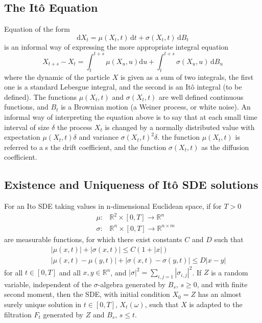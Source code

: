 \documentclass[12pt]{paper}
\begin{document}
\subsection{The It\^{o} Equation}
Equation of the form 
\begin{equation*}
 \mathrm{d} X_t = \mu(X_t,t)\, \mathrm{d} t +  \sigma(X_t,t)\, \mathrm{d} B_t
\end{equation*}
is an informal way of expressing the more appropriate integral equation 
\begin{equation*}
X_{t+s} - X_{t} = \int_t^{t+s} \mu(X_u,u) \mathrm{d} u + \int_t^{t+s} \sigma(X_u,u)\, \mathrm{d} B_u
\end{equation*}
where the dynamic of the particle $X$ is given as a sum of two integrals, the first one is a standard Lebesgue integral, and the second is an It\^{o} integral (to be defined).  
The functions $\mu(X_t,t)$ and $\sigma(X_t,t)$ are well defined continuous functions, and $B_t$ is a Brownian motion (a Weiner process, or white noise). An informal way of interpreting the equation above is to say that at each small time interval of size $\delta$ the process $X_t$ is changed by a normally distributed value with expectation $\mu(X_t,t)\delta$ and variance $\sigma(X_t,t)^2\delta$. 
the function $\mu(X_t,t)$ is referred to a s the drift coefficient, and the function $\sigma(X_t,t)$ as the diffusion coefficient. 

\subsection{Existence and Uniqueness of It\^{o} SDE solutions}
For an Ito SDE taking values in n-dimensional Euclidean space, if for $T>0$\\
\begin{eqnarray*}
&\mu:&\mathbb{R}^2\times[0,T]\rightarrow \mathbb{R}^n\\
&\sigma:&\mathbb{R}^n \times[0,T] \rightarrow \mathbb{R}^{n\times m}
\end{eqnarray*}
are measurable functions, for which there exist constants $C$ and $D$ such that 
\begin{eqnarray*}
&&|\mu(x,t)|+|\sigma(x,t)|\leq C(1+|x|)\\
&&|\mu(x,t)-\mu(y,t)|+|\sigma(x,t)-\sigma(y,t)|\leq D|x-y|
\end{eqnarray*}
for all $t\in [0,T]$ and all $x,y\in \mathbb{R}^n$, and $|\sigma|^2=\sum_{i,j=1}|\sigma_{i,j}|^2$. 
If $Z$ is a random variable, independent of the $\sigma$-algebra generated by $B_s$, $s\geq 0$, and with finite second moment, then the SDE, with initial condition $X_0=Z$ has an almost surely unique solution in $t\in[0,T]$, $X_t(\omega)$, such that $X$ is adapted to the filtration $F_t$ generated by $Z$ and $B_s$, $s\leq t$.
\end{document}
